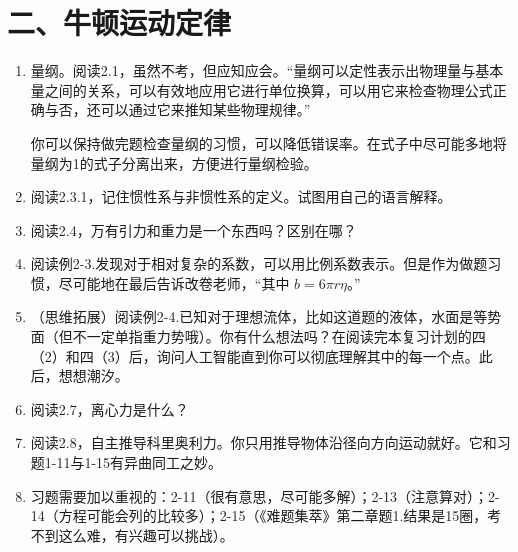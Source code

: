 \documentclass[12pt,a4paper]{article}
\begin{document}
\section{二、牛顿运动定律}
\begin{enumerate}[label=\arabic*.,leftmargin=*]
    \item 量纲。阅读2.1，虽然不考，但应知应会。“量纲可以定性表示出物理量与基本量之间的关系，可以有效地应用它进行单位换算，可以用它来检查物理公式正确与否，还可以通过它来推知某些物理规律。”
    
    你可以保持做完题检查量纲的习惯，可以降低错误率。在式子中尽可能多地将量纲为1的式子分离出来，方便进行量纲检验。

    \item 阅读2.3.1，记住惯性系与非惯性系的定义。试图用自己的语言解释。

    \item 阅读2.4，万有引力和重力是一个东西吗？区别在哪？

    \item 阅读例2-3.发现对于相对复杂的系数，可以用比例系数表示。但是作为做题习惯，尽可能地在最后告诉改卷老师，“其中 $b=6\pi r\eta$。”

    \item （思维拓展）阅读例2-4.已知对于理想流体，比如这道题的液体，水面是等势面（但不一定单指重力势哦）。你有什么想法吗？在阅读完本复习计划的四（2）和四（3）后，询问人工智能直到你可以彻底理解其中的每一个点。此后，想想潮汐。

    \item 阅读2.7，离心力是什么？

    \item 阅读2.8，自主推导科里奥利力。你只用推导物体沿径向方向运动就好。它和习题1-11与1-15有异曲同工之妙。

    \item 习题需要加以重视的：2-11（很有意思，尽可能多解）；2-13（注意算对）；2-14（方程可能会列的比较多）；2-15（《难题集萃》第二章题1.结果是15圈，考不到这么难，有兴趣可以挑战）。
\end{enumerate}
\end{document}
